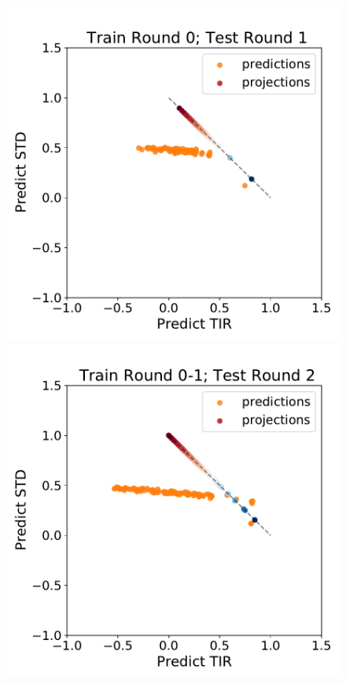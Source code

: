 \documentclass{scrartcl}[2013/05/29]%
\begin{document}
   
\begin{figure}[!ht]
   \centering
    \includegraphics[scale=0.35]{plots/Supplementary/proj_scatter_abc1_FF_0.pdf}
    \includegraphics[scale=0.35]{plots/Supplementary/proj_scatter_abc1_FF_1.pdf}

\end{figure}
\end{document}
